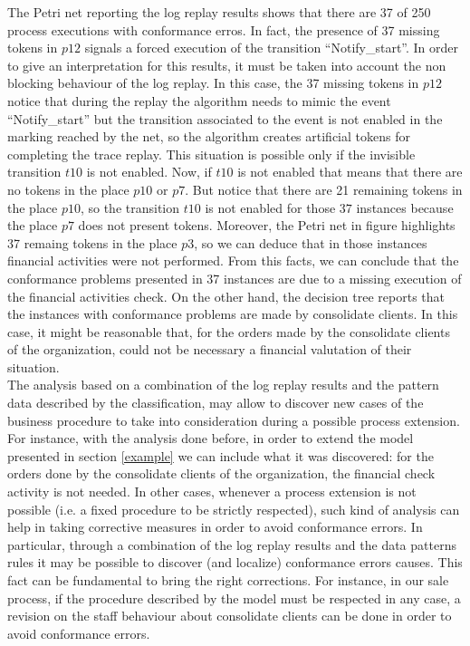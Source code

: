 \documentclass{llncs}
\begin{document}
The Petri net reporting the log replay results shows that there are 37 of 250 process executions with conformance erros. In fact, the presence of 37 missing tokens in $p12$ signals a forced execution of the transition ``Notify\_start''. In order to give an interpretation for this results, it must be taken into account the non blocking behaviour of the log replay. In this case, the 37 missing tokens in $p12$ notice that during the replay the algorithm needs to mimic the event ``Notify\_start'' but the transition associated to the event is not enabled in the marking reached by the net, so the algorithm creates artificial tokens for completing the trace replay. This situation is possible only if the invisible transition $t10$ is not enabled. Now, if $t10$ is not enabled that means that there are no tokens in the place $p10$ or $p7$. But notice that there are 21 remaining tokens in the place $p10$, so the transition $t10$ is not enabled for those $37$ instances because the place $p7$ does not present tokens. Moreover, the Petri net in figure highlights 37 remaing tokens in the place $p3$, so we can deduce that in those instances financial activities were not performed. From this facts, we can conclude that the conformance problems presented in  37 instances are due to a missing execution of the financial activities check. On the other hand, the decision tree reports that the instances with conformance problems are made by consolidate clients. In this case, it might be reasonable that, for the orders made by the consolidate clients of the organization, could not be necessary a financial valutation of their situation.\\


The analysis based on a combination of the log replay results and the pattern data described by the classification, may allow to discover new cases of the business procedure to take into consideration during a possible process extension. For instance, with the analysis done before, in order to extend the model presented in section \ref{example} we can include what it was discovered: for the orders done by the consolidate clients of  the organization, the financial check activity is not needed. In other cases, whenever  a process extension is not possible (i.e. a fixed procedure to be strictly respected), such kind of analysis can help in taking corrective measures in order to avoid conformance errors. In particular, through a combination of the log replay results and the data patterns rules it may be possible to discover (and localize) conformance errors causes. This fact can be fundamental to bring the right corrections. For instance, in our sale process, if the procedure described by the model must be respected in any case, a revision on the staff behaviour about consolidate clients can be done in order to avoid conformance errors.\\
\end{document}
